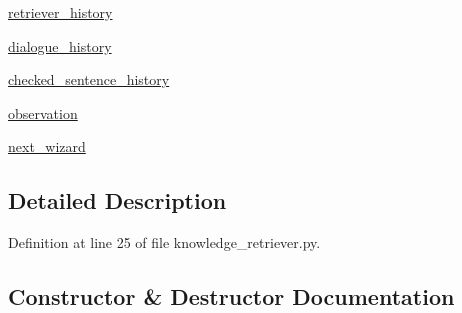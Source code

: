\begin{DoxyCompactItemize}
\item 
\hyperlink{classprojects_1_1wizard__of__wikipedia_1_1knowledge__retriever_1_1knowledge__retriever_1_1KnowledgeRetrieverAgent_ad3360729c61c66a52de9424ab1ca8b8b}{retriever\+\_\+history}
\item 
\hyperlink{classprojects_1_1wizard__of__wikipedia_1_1knowledge__retriever_1_1knowledge__retriever_1_1KnowledgeRetrieverAgent_abe817cce2fecf075e151320d3678f237}{dialogue\+\_\+history}
\item 
\hyperlink{classprojects_1_1wizard__of__wikipedia_1_1knowledge__retriever_1_1knowledge__retriever_1_1KnowledgeRetrieverAgent_a27159ce1397703ac47f63f4b7777c2c7}{checked\+\_\+sentence\+\_\+history}
\item 
\hyperlink{classprojects_1_1wizard__of__wikipedia_1_1knowledge__retriever_1_1knowledge__retriever_1_1KnowledgeRetrieverAgent_a5f5a97ffa5bbb97a1a15377a56fd4bdc}{observation}
\item 
\hyperlink{classprojects_1_1wizard__of__wikipedia_1_1knowledge__retriever_1_1knowledge__retriever_1_1KnowledgeRetrieverAgent_a23b756fa8cd8524012ea20ac623ea1f1}{next\+\_\+wizard}
\end{DoxyCompactItemize}


\subsection{Detailed Description}


Definition at line 25 of file knowledge\+\_\+retriever.\+py.



\subsection{Constructor \& Destructor Documentation}
\mbox{\label{classprojects_1_1wizard__of__wikipedia_1_1knowledge__retriever_1_1knowledge__retriever_1_1KnowledgeRetrieverAgent_a56e833bf9622d078a5b8b808091e9060}} 
